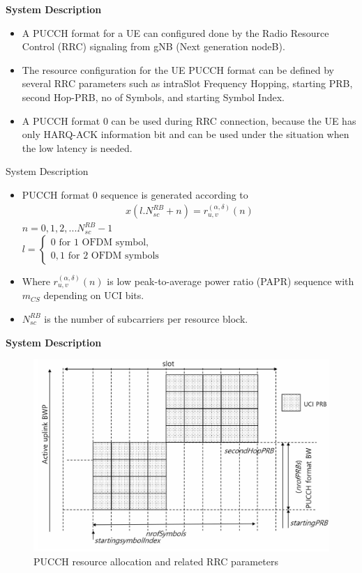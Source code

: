 \documentclass{beamer}
\begin{document}
\begin{frame}{\textbf{System Description}}
    \begin{itemize}
        \item A PUCCH format for a UE can configured done by the Radio Resource Control (RRC) signaling from gNB (Next generation nodeB).
        \item  The resource configuration for the UE
PUCCH format can be defined by several RRC parameters
such as intraSlot Frequency Hopping, starting PRB, second Hop-PRB, no of Symbols, and starting Symbol Index.
        \item  A PUCCH format 0 can be used during RRC connection, because the UE has only HARQ-ACK information bit and can be used under the
situation when the low latency is needed.
 \end{itemize}
\end{frame}
\begin{frame}{System Description}
    \begin{itemize}
        \item PUCCH format 0 sequence is generated according to
        \begin{align}
            x(l.N^{RB}_{sc}+n)=r^{(\alpha,\delta)}_{u,v}(n)
        \end{align}
$n=0,1,2,...N^{RB}_{sc}-1$
\\
$
l=
\begin{cases}
    0 \text{  for 1 OFDM symbol,}\\
    0,1 \text{  for 2 OFDM symbols}
\end{cases}
$
\item Where $r^{(\alpha,\delta)}_{u,v}(n)$ is low peak-to-average power ratio (PAPR) sequence with $m_{CS}$ depending on UCI bits.
\item $N^{RB}_{sc}$ is the number of subcarriers per resource block.
    \end{itemize}
\end{frame}
\begin{frame}{\textbf{System Description}}
\begin{figure}
    \centering
    \includegraphics[scale=0.3 ]{RRC .png}
    \caption{ PUCCH resource allocation and related RRC parameters}
\end{figure}
\end{frame}
\end{document}
